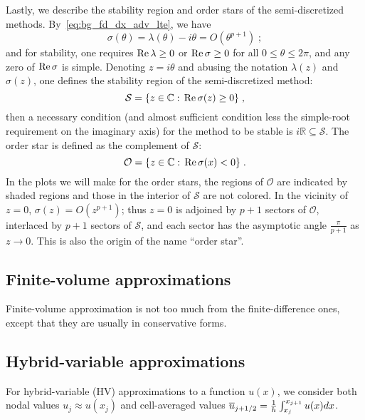 Lastly, we describe the stability region and order stars of the semi-discretized methods.
By~\cref{eq:bg_fd_dx_adv_lte}, we have
\begin{equation}\label{eq:bg_fd_dx_lambda_order}
  \sigma(\theta) = \lambda(\theta) - i\theta = O(\theta^{p+1})\;;
\end{equation}
and for stability, one requires $\operatorname{Re}\lambda\ge0$ or $\operatorname{Re}\sigma\ge0$ for all $0\le\theta\le2\pi$, and any zero of $\operatorname{Re}\sigma$ is simple.
Denoting $z=i\theta$ and abusing the notation $\lambda(z)$ and $\sigma(z)$, one defines the stability region of the semi-discretized method:
\begin{equation}\label{eq:bg_fd_dx_lambda_stab}
  \mathcal{S} = \{z\in\mathbb{C}:\,\operatorname{Re}\sigma(z)\ge0\}\;,
\end{equation}
then a necessary condition (and almost sufficient condition less the simple-root requirement on the imaginary axis) for the method to be stable is $i\mathbb{R}\subseteq\mathcal{S}$.
The order star is defined as the complement of $\mathcal{S}$:
\begin{equation}\label{eq:bg_fd_dx_lambda_os}
  \mathcal{O} = \{z\in\mathbb{C}:\,\operatorname{Re}\sigma(x)<0\}\;.
\end{equation}
In the plots we will make for the order stars, the regions of $\mathcal{O}$ are indicated by shaded regions and those in the interior of $\mathcal{S}$ are not colored.
In the vicinity of $z=0$, $\sigma(z)=O(z^{p+1})$; thus $z=0$ is adjoined by $p+1$ sectors of $\mathcal{O}$, interlaced by $p+1$ sectors of $\mathcal{S}$, and each sector has the asymptotic angle $\frac{\pi}{p+1}$ as $z\to0$.
This is also the origin of the name ``order star''.

\subsection{Finite-volume approximations}
\label{sec:bg_fv}
Finite-volume approximation is not too much from the finite-difference ones, except that they are usually in conservative forms.

\subsection{Hybrid-variable approximations}
\label{sec:bg_hv}
For hybrid-variable (HV) approximations to a function $u(x)$, we consider both nodal values $u_j\approx u(x_j)$ and cell-averaged values $\overline{u}_{{{j}+1/2}}=\frac{1}{h}\int_{x_j}^{x_{j+1}}u(x)dx$.

